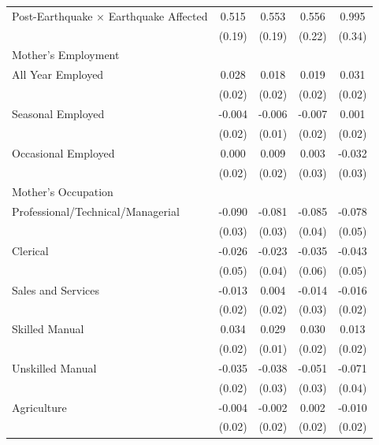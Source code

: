 \begin{longtable}{l*{4}{c}}
Post-Earthquake × Earthquake Affected & 0.515\sym{***} & 0.553\sym{***} & 0.556\sym{**} & 0.995\sym{***} \\
                    & (0.19) & (0.19) & (0.22) & (0.34) \\
\multicolumn{5}{l}{Mother's Employment} \\
\hspace{1em}All Year Employed & 0.028 & 0.018 & 0.019 & 0.031 \\
                    & (0.02) & (0.02) & (0.02) & (0.02) \\
\hspace{1em}Seasonal Employed & -0.004 & -0.006 & -0.007 & 0.001 \\
                    & (0.02) & (0.01) & (0.02) & (0.02) \\
\hspace{1em}Occasional Employed & 0.000 & 0.009 & 0.003 & -0.032 \\
                    & (0.02) & (0.02) & (0.03) & (0.03) \\
\multicolumn{5}{l}{Mother's Occupation} \\
\hspace{1em}Professional/Technical/Managerial & -0.090\sym{***} & -0.081\sym{***} & -0.085\sym{**} & -0.078 \\
                    & (0.03) & (0.03) & (0.04) & (0.05) \\
\hspace{1em}Clerical & -0.026 & -0.023 & -0.035 & -0.043 \\
                    & (0.05) & (0.04) & (0.06) & (0.05) \\
\hspace{1em}Sales and Services & -0.013 & 0.004 & -0.014 & -0.016 \\
                    & (0.02) & (0.02) & (0.03) & (0.02) \\
\hspace{1em}Skilled Manual & 0.034\sym{**} & 0.029\sym{**} & 0.030 & 0.013 \\
                    & (0.02) & (0.01) & (0.02) & (0.02) \\
\hspace{1em}Unskilled Manual & -0.035 & -0.038 & -0.051 & -0.071\sym{*} \\
                    & (0.02) & (0.03) & (0.03) & (0.04) \\
\hspace{1em}Agriculture & -0.004 & -0.002 & 0.002 & -0.010 \\
                    & (0.02) & (0.02) & (0.02) & (0.02) \\

\end{longtable}
